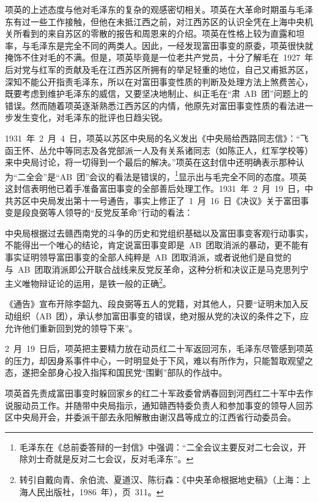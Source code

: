 项英的上述态度与他对毛泽东的复杂的观感密切相关。项英在大革命时期虽与毛泽东有过一些工作接触，但他在未抵江西之前，对江西苏区的认识全凭在上海中央机关所看到的来自苏区的零散的报告和周恩来的介绍。项英在性格上较为直露和坦率，与毛泽东是完全不同的两类人。因此，一经发现富田事变的原委，项英很快就掩饰不住对毛的不满。但是，项英毕竟是一位老共产党员，十分了解毛在~1927~年后对党与红军的贡献及毛在江西苏区所拥有的举足轻重的地位，自己又甫抵苏区，深知不能公开指责毛泽东，所以在对富田事变性质的判断及处理方法上煞费苦心，既要考虑到维护毛泽东的威信，又要坚决地制止、纠正毛在“肃~AB~团”问题上的错误。然而随着项英逐渐熟悉江西苏区的内情，他原先对富田事变性质的看法进一步发生变化，对毛泽东的批评也日趋尖锐。

1931~年~2~月~4~日，项英以苏区中央局的名义发出《中央局给西路同志信》：“飞函王怀、丛允中等同志及各党部派一人及有关系诸同志（如陈正人，红军学校等）来中央局讨论，将一切得到一个最后的解决。”项英在这封信中还明确表示那种认为“二全会”是“AB~团”会议的看法是错误的，\footnote{毛泽东在《总前委答辩的一封信》中强调：“二全会议主要反对二七会议，开除刘士奇就是反对二七会议，反对毛泽东”。}显示出与毛完全不同的态度。项英这封信表明他已着手准备富田事变的全部善后处理工作。1931~年~2~月~19~日，中共苏区中央局发出第十一号通告，事实上修正了~1~月~16~日《决议》关于富田事变是段良弼等人领导的“反党反革命”行动的看法：

\begin{quoting}
中央局根据过去赣西南党的斗争的历史和党组织基础以及富田事变客观行动事实，不能得出一个唯心的结论，肯定说富田事变即是~AB~团取消派的暴动，更不能有事实证明领导富田事变的全部人纯粹是~AB~团取消派，或者说他们是自觉的与~AB~团取消派即公开联合战线来反党反革命，这种分析和决议正是马克思列宁主义唯物辩证论的运用，是铁一般的正确\footnote{转引自戴向青、余伯流、夏道汉、陈衍森：《中央革命根据地史稿》（上海：上海人民出版社，1986~年），页~311。}。
\end{quoting}

《通告》宣布开除李韶九、段良弼等五人的党籍，对其他人，只要“证明未加入反动组织（AB~团），承认参加富田事变的错误，绝对服从党的决议的条件之下，应允许他们重新回到党的领导下来”。

2~月~19~日后，项英把主要精力放在动员红二十军返回河东，毛泽东尽管感到项英的压力，却因身系事件中心，一时明显处于下风，难以有所作为，只能暂取观望之态，遂把全部身心投入指挥和国民党“围剿”部队的作战中。

项英首先责成富田事变时躲回家乡的红二十军政委曾炳春回到河西红二十军中去作说服动员工作。并随带中央局指示，通知赣西特委负责人和参加事变的领导人回苏区中央局开会，并委派干部去永阳解散由谢汉昌等成立的江西省行动委员会。

